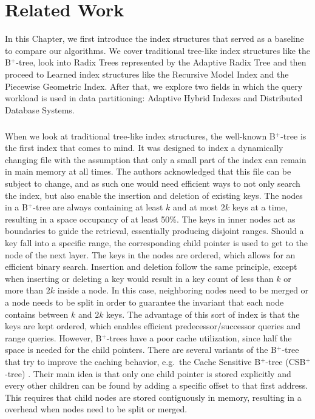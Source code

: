 \thispagestyle{plain}
\chapter{Related Work}\label{sec:related_work}

In this Chapter, we first introduce the index structures that served as a baseline to compare our algorithms. We cover traditional tree-like index structures like the B$^+$-tree, look into Radix Trees represented by the Adaptive Radix Tree and then proceed to Learned index structures like the Recursive Model Index and the Piecewise Geometric Index. After that, we explore two fields in which the query workload is used in data partitioning: Adaptive Hybrid Indexes and Distributed Database Systems.

\paragraph{} 
When we look at traditional tree-like index structures, the well-known B$^+$-tree \cite{Bayer1970-rh} is the first index that comes to mind. It was designed to index a dynamically changing file with the assumption that only a small part of the index can remain in main memory at all times. The authors acknowledged that this file can be subject to change, and as such one would need efficient ways to not only search the index, but also enable the insertion and deletion of existing keys. The nodes in a B$^+$-tree are always containing at least $k$ and at most $2k$ keys at a time, resulting in a space occupancy of at least 50\%. The keys in inner nodes act as boundaries to guide the retrieval, essentially producing disjoint ranges. Should a key fall into a specific range, the corresponding child pointer is used to get to the node of the next layer. The keys in the nodes are ordered, which allows for an efficient binary search. Insertion and deletion follow the same principle, except when inserting or deleting a key would result in a key count of less than $k$ or more than $2k$ inside a node. In this case, neighboring nodes need to be merged or a node needs to be split in order to guarantee the invariant that each node contains between $k$ and $2k$ keys. The advantage of this sort of index is that the keys are kept ordered, which enables efficient predecessor/successor queries and range queries. However, B$^+$-trees have a poor cache utilization, since half the space is needed for the child pointers. There are several variants of the B$^+$-tree that try to improve the caching behavior, e.g.~the Cache Sensitive B$^+$-tree (CSB$^+$-tree) \cite{Rao2000}. Their main idea is that only one child pointer is stored explicitly and every other children can be found by adding a specific offset to that first address. This requires that child nodes are stored contiguously in memory, resulting in a overhead when nodes need to be split or merged.

